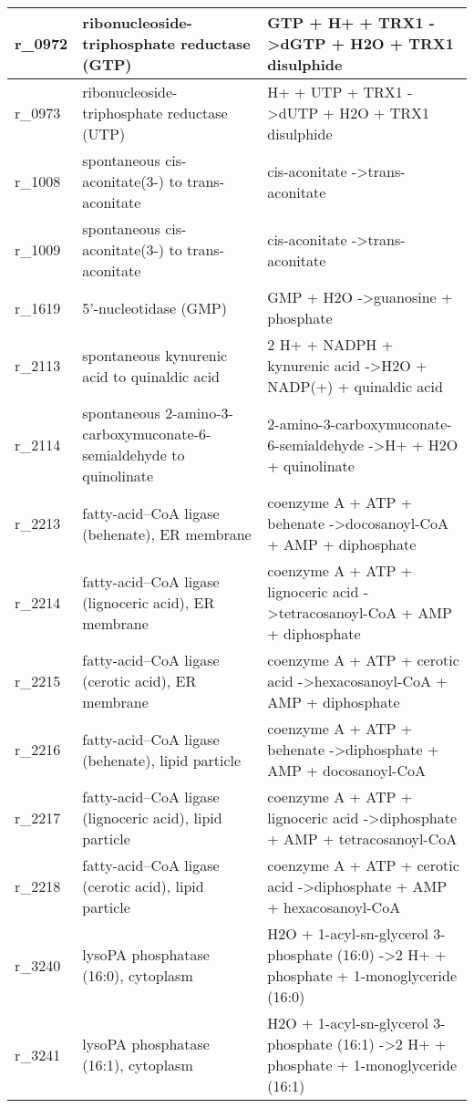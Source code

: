 \begin{landscape}
{\begin{longtable}{|l|p{7cm}|p{15cm}|}
r\_0972 & ribonucleoside-triphosphate reductase (GTP) & GTP + H+ + TRX1  -\textgreater dGTP + H2O + TRX1 disulphide \\ \hline
r\_0973 & ribonucleoside-triphosphate reductase (UTP) & H+ + UTP + TRX1  -\textgreater dUTP + H2O + TRX1 disulphide \\ \hline
r\_1008 & spontaneous cis-aconitate(3-) to trans-aconitate & cis-aconitate  -\textgreater trans-aconitate \\ \hline
r\_1009 & spontaneous cis-aconitate(3-) to trans-aconitate & cis-aconitate  -\textgreater trans-aconitate \\ \hline
r\_1619 & 5'-nucleotidase (GMP) & GMP + H2O  -\textgreater guanosine + phosphate \\ \hline
r\_2113 & spontaneous kynurenic acid to quinaldic acid & 2 H+ + NADPH + kynurenic acid  -\textgreater H2O + NADP(+) + quinaldic acid \\ \hline
r\_2114 & spontaneous 2-amino-3-carboxymuconate-6-semialdehyde to quinolinate & 2-amino-3-carboxymuconate-6-semialdehyde  -\textgreater H+ + H2O + quinolinate \\ \hline
r\_2213 & fatty-acid--CoA ligase (behenate), ER membrane & coenzyme A + ATP + behenate  -\textgreater docosanoyl-CoA + AMP + diphosphate \\ \hline
r\_2214 & fatty-acid--CoA ligase (lignoceric acid), ER membrane & coenzyme A + ATP + lignoceric acid  -\textgreater tetracosanoyl-CoA + AMP + diphosphate \\ \hline
r\_2215 & fatty-acid--CoA ligase (cerotic acid), ER membrane & coenzyme A + ATP + cerotic acid  -\textgreater hexacosanoyl-CoA + AMP + diphosphate \\ \hline
r\_2216 & fatty-acid--CoA ligase (behenate), lipid particle & coenzyme A + ATP + behenate  -\textgreater diphosphate + AMP + docosanoyl-CoA \\ \hline
r\_2217 & fatty-acid--CoA ligase (lignoceric acid), lipid particle & coenzyme A + ATP + lignoceric acid  -\textgreater diphosphate + AMP + tetracosanoyl-CoA \\ \hline
r\_2218 & fatty-acid--CoA ligase (cerotic acid), lipid particle & coenzyme A + ATP + cerotic acid  -\textgreater diphosphate + AMP + hexacosanoyl-CoA \\ \hline
r\_3240 & lysoPA phosphatase (16:0), cytoplasm & H2O + 1-acyl-sn-glycerol 3-phosphate (16:0)  -\textgreater 2 H+ + phosphate + 1-monoglyceride (16:0) \\ \hline
r\_3241 & lysoPA phosphatase (16:1), cytoplasm & H2O + 1-acyl-sn-glycerol 3-phosphate (16:1)  -\textgreater 2 H+ + phosphate + 1-monoglyceride (16:1) \\ \hline

\end{longtable}}
\end{landscape}
